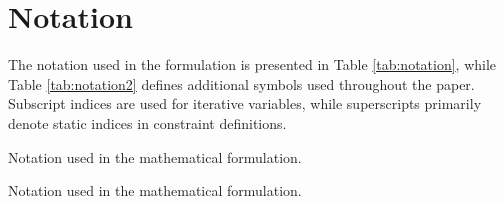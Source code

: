 \documentclass[12pt]{article}
\begin{document}
\section*{Notation}

The notation used in the formulation is presented in Table \ref{tab:notation}, while Table \ref{tab:notation2} defines additional symbols used throughout the paper. Subscript indices are used for iterative variables, while superscripts primarily denote static indices in constraint definitions.

\begin{table}[h]
    \centering
    \caption{Notation used in the mathematical formulation.}
    \label{tab:notation}
\end{table}

\begin{table}[h]
    \centering
    \caption{Notation used in the mathematical formulation.}
    \label{tab:notation2}
\end{table}









\end{document}
